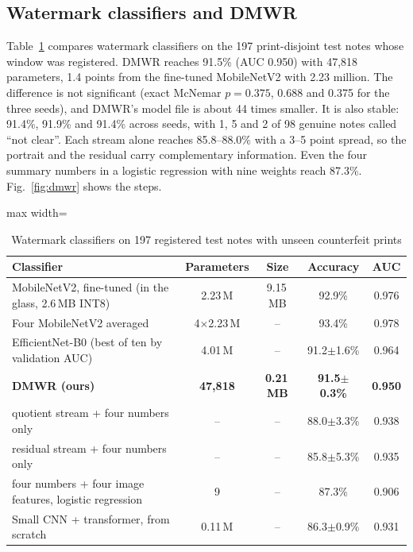 \documentclass[preprint,12pt]{elsarticle}
\begin{document}
\subsection{Watermark classifiers and DMWR}
\label{sec:res_dmwr}
Table~\ref{tab:wm} compares watermark classifiers on the 197 print-disjoint test notes whose window was registered. DMWR reaches 91.5\% (AUC 0.950) with 47,818 parameters, 1.4 points from the fine-tuned MobileNetV2 with 2.23 million. The difference is not significant (exact McNemar $p=0.375$, 0.688 and 0.375 for the three seeds), and DMWR's model file is about 44 times smaller. It is also stable: 91.4\%, 91.9\% and 91.4\% across seeds, with 1, 5 and 2 of 98 genuine notes called ``not clear''. Each stream alone reaches 85.8--88.0\% with a 3--5 point spread, so the portrait and the residual carry complementary information. Even the four summary numbers in a logistic regression with nine weights reach 87.3\%. Fig.~\ref{fig:dmwr} shows the steps.

\begin{table}[!htbp]
\caption{Watermark classifiers on 197 registered test notes with unseen counterfeit prints}
\label{tab:wm}
\centering\small
\begin{adjustbox}{max width=\textwidth}\begin{tabular}{@{}lcccc@{}}
\toprule
Classifier & Parameters & Size & Accuracy & AUC \\ \midrule
MobileNetV2, fine-tuned (in the glass, 2.6\,MB INT8) & 2.23\,M & 9.15\,MB & 92.9\% & 0.976 \\
Four MobileNetV2 averaged & 4$\times$2.23\,M & -- & 93.4\% & 0.978 \\
EfficientNet-B0 (best of ten by validation AUC) & 4.01\,M & -- & 91.2$\pm$1.6\% & 0.964 \\
\textbf{DMWR (ours)} & \textbf{47,818} & \textbf{0.21\,MB} & \textbf{91.5$\pm$0.3\%} & \textbf{0.950} \\
\quad quotient stream + four numbers only & -- & -- & 88.0$\pm$3.3\% & 0.938 \\
\quad residual stream + four numbers only & -- & -- & 85.8$\pm$5.3\% & 0.935 \\
\quad four numbers + four image features, logistic regression & 9 & -- & 87.3\% & 0.906 \\
Small CNN + transformer, from scratch & 0.11\,M & -- & 86.3$\pm$0.9\% & 0.931 \\ \bottomrule
\end{tabular}\end{adjustbox}
\end{table}
\end{document}
